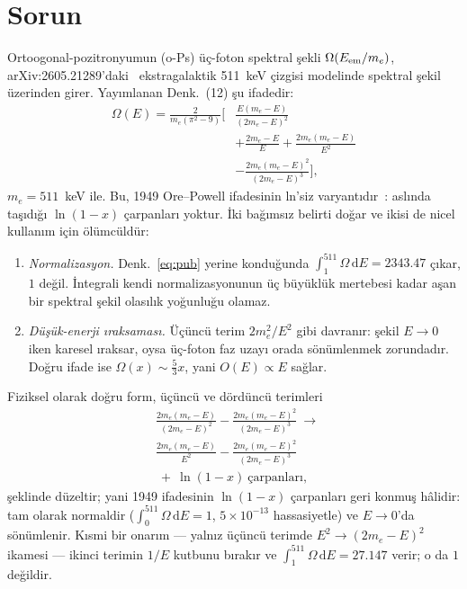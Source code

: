 \documentclass[twocolumn]{svjour3}
\begin{document}
\section{Sorun}
Ortoogonal-pozitronyumun (o-Ps) üç-foton spektral şekli
$\Omega(E_{\rm em}/m_e)$, arXiv:2605.21289'daki~\cite{sy26} ekstragalaktik
511~keV çizgisi modelinde spektral şekil üzerinden girer. Yayımlanan
Denk.~(12) şu ifadedir:
\begin{equation}
\label{eq:pub}
\begin{split}
\Omega(E) = \frac{2}{m_e(\pi^2-9)}\biggl[&
\frac{E(m_e-E)}{(2m_e-E)^2} \\
&+ \frac{2m_e-E}{E} + \frac{2m_e(m_e-E)}{E^2} \\
&- \frac{2m_e(m_e-E)^2}{(2m_e-E)^3}\biggr],
\end{split}
\end{equation}
$m_e = 511$~keV ile. Bu, 1949 Ore--Powell ifadesinin ln'siz
varyantıdır~\cite{ore49}: aslında taşıdığı $\ln(1-x)$ çarpanları
yoktur. İki bağımsız belirti doğar ve ikisi de nicel kullanım için
ölümcüldür:
\begin{enumerate}
    \item \emph{Normalizasyon.} Denk.~\eqref{eq:pub} yerine konduğunda
    $\int_{1}^{511}\allowbreak\Omega\,\mathrm{d}E = 2343.47$ çıkar, $1$ değil.
    İntegrali kendi normalizasyonunun üç büyüklük mertebesi kadar
    aşan bir spektral şekil olasılık yoğunluğu olamaz.
    \item \emph{Düşük-enerji ıraksaması.} Üçüncü terim $2m_e^2/E^2$
    gibi davranır: şekil $E\to 0$ iken karesel ıraksar, oysa üç-foton
    faz uzayı orada sönümlenmek zorundadır. Doğru ifade ise
    $\Omega(x)\sim\tfrac{5}{3}x$, yani $O(E)\propto E$ sağlar.
\end{enumerate}
Fiziksel olarak doğru form, üçüncü ve dördüncü terimleri
\begin{equation}
\label{eq:corr}
\begin{split}
&\frac{2m_e(m_e-E)}{(2m_e-E)^2}
- \frac{2m_e(m_e-E)^2}{(2m_e-E)^3}
\ \longrightarrow\ \\
&\frac{2m_e(m_e-E)}{E^2}
- \frac{2m_e(m_e-E)^2}{(2m_e-E)^3} \\
&\ +\ \ln(1-x)\ \text{çarpanları},
\end{split}
\end{equation}
şeklinde düzeltir; yani 1949 ifadesinin $\ln(1-x)$ çarpanları geri
konmuş hâlidir: tam olarak normaldir
($\int_0^{511}\allowbreak\Omega\,\mathrm{d}E = 1$, $5\times10^{-13}$ hassasiyetle)
ve $E\to 0$'da sönümlenir. Kısmi bir onarım --- yalnız üçüncü
terimde $E^2 \to (2m_e-E)^2$ ikamesi --- ikinci terimin $1/E$ kutbunu
bırakır ve $\int_{1}^{511}\Omega\,\mathrm{d}E = 27.147$ verir; o da $1$
değildir.
\end{document}
